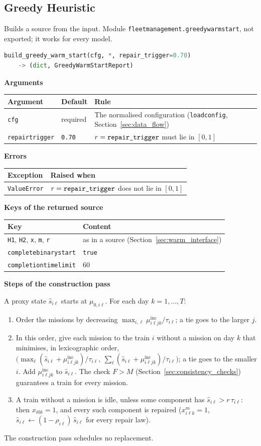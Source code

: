 \documentclass[11pt,a4paper]{article}
\makeatletter
\theoremstyle{plain}
\theoremstyle{definition}
\newcommand{\inc}{\mathrm{inc}}
\newcommand{\blockhead}[1]{\par\noindent\textbf{#1}\par\nobreak}
\renewcommand{\_}{\textunderscore\allowbreak{}}
\providecommand{\rejrow}[2]{{\raggedright #1\par} & {\raggedright #2\par} \\}
\providecommand{\typerow}[3]{{\raggedright #1\par} & {\raggedright #2\par} & {\raggedright #3\par} \\}
\providecommand{\tabstart}[2]{\begingroup\small\begin{longtable}{@{}#1@{}}\toprule #2 \\ \midrule \endhead}
\providecommand{\tabend}{\bottomrule\end{longtable}\endgroup}
\makeatother
\begin{document}
\subsection{Greedy Heuristic}
\label{sec:greedy}

Builds a source from the input. Module \texttt{fleet\_management.greedy\_warm\_start}, not exported; it works for every model.

\begin{lstlisting}[language=Python]
build_greedy_warm_start(cfg, *, repair_trigger=0.70)
    -> (dict, GreedyWarmStartReport)
\end{lstlisting}

\blockhead{Arguments}
\tabstart{p{4.3cm}p{2.3cm}p{8.2cm}}{Argument & Default & Rule}
\typerow{\texttt{cfg}}{required}{The normalised configuration (\texttt{load\_config}, Section~\ref{sec:data_flow})}
\typerow{\texttt{repair\_trigger}}{\texttt{0.70}}{$r = \texttt{repair\_trigger}$ must lie in $[0,1]$}
\tabend

\blockhead{Errors}
\tabstart{p{3.4cm}p{11.6cm}}{Exception & Raised when}
\rejrow{\texttt{ValueError}}{$r = \texttt{repair\_trigger}$ does not lie in $[0,1]$}
\tabend

\blockhead{Keys of the returned source}
\tabstart{p{5.2cm}p{9.8cm}}{Key & Content}
\rejrow{\texttt{H1}, \texttt{H2}, \texttt{x}, \texttt{m}, \texttt{r}}{as in a source (Section~\ref{sec:warm_interface})}
\rejrow{\texttt{complete\_binary\_start}}{\texttt{true}}
\rejrow{\texttt{completion\_time\_limit}}{$60$}
\tabend

\blockhead{Steps of the construction pass}
A proxy state $\hat s_{i\ell}$ starts at $\mu_{0,i\ell}$. For each day $k = 1,\ldots,T$:
\begin{enumerate}[nosep,label=\arabic*.]
  \item Order the missions by decreasing $\max_{i,\ell} \mu^{\inc}_{i\ell jk}/\tau_{i\ell}$; a tie goes to the larger $j$.
  \item In this order, give each mission to the train $i$ without a mission on day $k$ that minimises, in lexicographic order,
    $\bigl(\max_\ell (\hat s_{i\ell} + \mu^{\inc}_{i\ell jk})/\tau_{i\ell},\ \sum_\ell (\hat s_{i\ell} + \mu^{\inc}_{i\ell jk})/\tau_{i\ell}\bigr)$; a tie goes to the smaller $i$.
    Add $\mu^{\inc}_{i\ell jk}$ to $\hat s_{i\ell}$. The check $F > M$ (Section~\ref{sec:consistency_checks}) guarantees a train for every mission.
  \item A train without a mission is idle, unless some component has $\hat s_{i\ell} > r\,\tau_{i\ell}$: then $x_{i0k} = 1$, and every such component is repaired ($x^m_{i\ell k} = 1$, $\hat s_{i\ell} \leftarrow (1-\rho_{i\ell})\,\hat s_{i\ell}$ for every repair law).
\end{enumerate}
The construction pass schedules no replacement.
\end{document}
